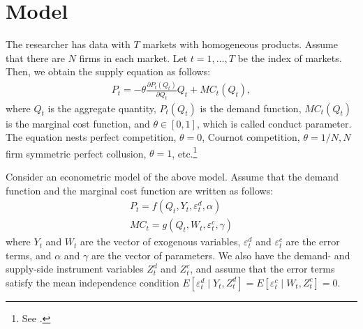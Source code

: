 \documentclass[11pt, a4paper]{article}
\begin{document}
\section{Model}
The researcher has data with $T$ markets with homogeneous products.
Assume that there are $N$ firms in each market.
Let $t = 1,\ldots, T$ be the index of markets.
Then, we obtain the supply equation as follows:
\begin{align}
     P_t = -\theta\frac{\partial P_t(Q_{t})}{\partial Q_{t}}Q_{t} + MC_t(Q_{t}),\label{eq:supply_equation}
\end{align}
where $Q_{t}$ is the aggregate quantity, $P_t(Q_{t})$ is the demand function, $MC_{t}(Q_{t})$ is the marginal cost function, and $\theta\in[0,1]$, which is called conduct parameter. 
The equation nests perfect competition, $\theta=0$, Cournot competition, $\theta=1/N, N$ firm symmetric perfect collusion, $\theta=1$, etc.\footnote{See \cite{bresnahan1982oligopoly}.} 

Consider an econometric model of the above model.
Assume that the demand function and the marginal cost function are written as follows: 
\begin{align}
    P_t = f(Q_{t}, Y_t, \varepsilon^{d}_{t}, \alpha) \label{eq:demand}\\
    MC_t = g(Q_{t}, W_{t}, \varepsilon^{c}_{t}, \gamma)\label{eq:marginal_cost}
\end{align}
where $Y_t$ and $W_{t}$ are the vector of exogenous variables, $\varepsilon^{d}_{t}$ and $\varepsilon^{c}_{t}$ are the error terms, and $\alpha$ and $\gamma$ are the vector of parameters.
We also have the demand- and supply-side instrument variables $Z^{d}_{t}$ and $Z^{c}_{t}$, and assume that the error terms satisfy the mean independence condition $E[\varepsilon^{d}_{t}\mid Y_t, Z^{d}_{t}] = E[\varepsilon^{c}_{t} \mid W_{t}, Z^{c}_{t}] =0$.
\end{document}
